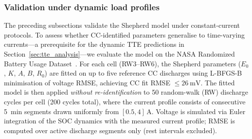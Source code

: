 \documentclass[5p,times,number]{elsarticle}
\newcommand{\secref}[1]{\hyperref[#1]{\textup{Section~\ref*{#1}}}}
\def\secref#1{Section~\ref{#1}}
\begin{document}
\subsubsection{Validation under dynamic load profiles}\label{sec:dynamic_val}
The preceding subsections validate the Shepherd model under constant-current protocols.
To assess whether CC-identified parameters generalise to time-varying currents---a prerequisite for the dynamic TTE predictions in \secref{sec:tte_analysis}---we evaluate the model on the NASA Randomized Battery Usage Dataset~\cite{Bole2014}.
For each cell (RW3--RW6), the Shepherd parameters ($E_0$, $K$, $A$, $B$, $R_0$) are fitted on up to five reference CC discharges using L-BFGS-B minimisation of voltage RMSE, achieving CC fit RMSE $\le \SI{26}{\milli\volt}$.
The fitted model is then applied \emph{without re-identification} to 50 random-walk (RW) discharge cycles per cell (200 cycles total), where the current profile consists of consecutive \SI{5}{\minute} segments drawn uniformly from $[0.5, 4]$\,A.
Voltage is simulated via Euler integration of the SOC dynamics with the measured current profile; RMSE is computed over active discharge segments only (rest intervals excluded).
\end{document}
